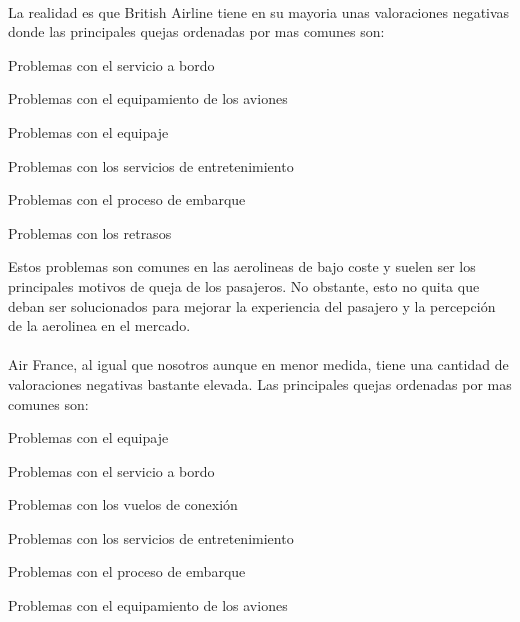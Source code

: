 \documentclass{report}
\begin{document}
{            \paragraph*{}
            {
                La realidad es que British Airline tiene en su mayoria unas valoraciones negativas donde las principales quejas ordenadas por mas comunes son:
            }
            \begin{enumerate}
                \begin{multicols}{2}
                    \item Problemas con el servicio a bordo
                    \item Problemas con el equipamiento de los aviones
                    \item Problemas con el equipaje
                    \item Problemas con los servicios de entretenimiento
                    \item Problemas con el proceso de embarque
                    \item Problemas con los retrasos
                \end{multicols}
            \end{enumerate}
            Estos problemas son comunes en las aerolineas de bajo coste y suelen ser los principales motivos de queja de los pasajeros.
            No obstante, esto no quita que deban ser solucionados para mejorar la experiencia del pasajero y la percepción de la aerolinea en el mercado.
            \paragraph*{}
            {
                Air France, al igual que nosotros aunque en menor medida, tiene una cantidad de valoraciones negativas bastante elevada.
                Las principales quejas ordenadas por mas comunes son:
            }
            \begin{enumerate}
                \begin{multicols}{2}
                    \item Problemas con el equipaje
                    \item Problemas con el servicio a bordo
                    \item Problemas con los vuelos de conexión
                    \item Problemas con los servicios de entretenimiento
                    \item Problemas con el proceso de embarque
                    \item Problemas con el equipamiento de los aviones
                \end{multicols}
            \end{enumerate}
}
\end{document}
